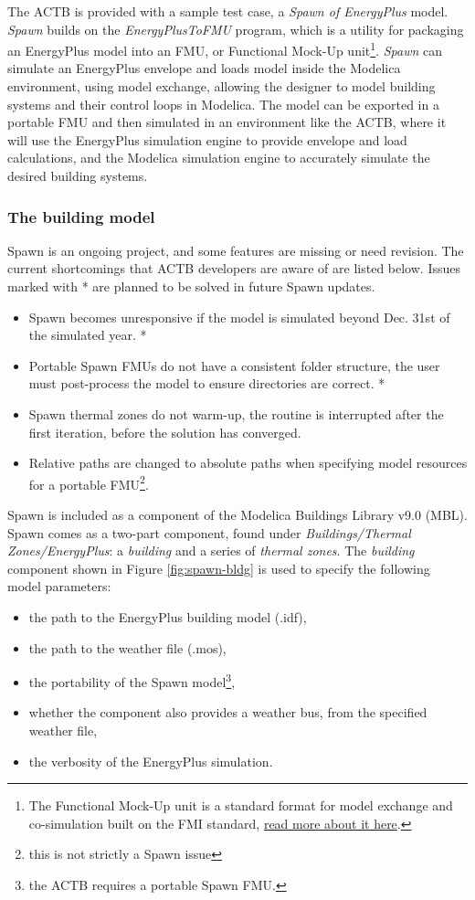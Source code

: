 \documentclass{article}
\begin{document}
The ACTB is provided with a sample test case, a \textit{Spawn of EnergyPlus} model. \textit{Spawn} builds on the \textit{EnergyPlusToFMU}  program, which is a utility for packaging an EnergyPlus model into an FMU, or Functional Mock-Up unit\footnote{The Functional Mock-Up unit is a standard format for model exchange and co-simulation built on the FMI standard, \href{https://fmi-standard.org/}{read more about it here}.}. \textit{Spawn} can simulate an EnergyPlus envelope and loads model inside the Modelica environment, using model exchange, allowing the designer to model building systems and their control loops in Modelica. The model can be exported in a portable FMU and then simulated in an environment like the ACTB, where it will use the EnergyPlus simulation engine to provide envelope and load calculations, and the Modelica simulation engine to accurately simulate the desired building systems.

\subsubsection{The building model}

Spawn is an ongoing project, and some features are missing or need revision. The current shortcomings that ACTB developers are aware of are listed below. Issues marked with * are planned to be solved in future Spawn updates.

\begin{itemize}
    \item Spawn becomes unresponsive if the model is simulated beyond Dec. 31st of the simulated year. *
    \item Portable Spawn FMUs do not have a consistent folder structure, the user must post-process the model to ensure directories are correct. *
    \item Spawn thermal zones do not warm-up, the routine is interrupted after the first iteration, before the solution has converged.
    \item Relative paths are changed to absolute paths when specifying model resources for a portable FMU\footnote{this is not strictly a Spawn issue}.
\end{itemize}

Spawn is included as a component of the Modelica Buildings Library v9.0 (MBL). Spawn comes as a two-part component, found under \textit{Buildings/Thermal Zones/EnergyPlus}: a \textit{building} and a series of \textit{thermal zones}. The \textit{building} component shown in Figure \ref{fig:spawn-bldg} is used to specify the following model parameters:
\begin{itemize}
    \item the path to the EnergyPlus building model (.idf),
    \item the path to the weather file (.mos),
    \item the portability of the Spawn model\footnote{the ACTB requires a portable Spawn FMU.},
    \item whether the component also provides a weather bus, from the specified weather file,
    \item the verbosity of the EnergyPlus simulation.
\end{itemize}
\end{document}
